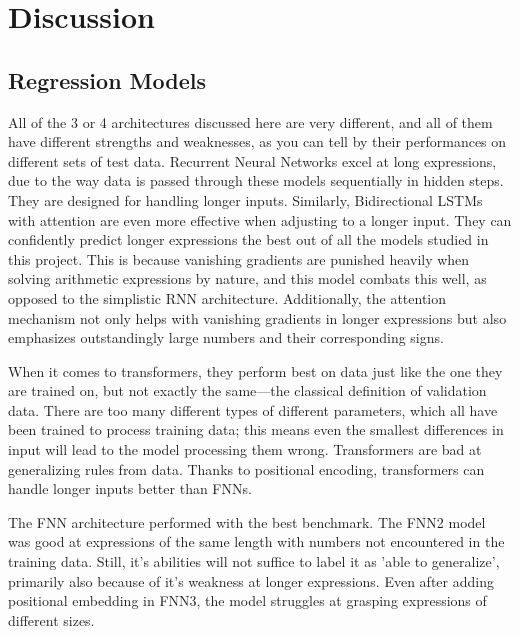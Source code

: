 \documentclass{article}
\begin{document}
\section{Discussion}
\subsection{Regression Models}
All of the 3 or 4 architectures discussed here are very different, and all of them have different strengths and weaknesses, as you can tell by their performances on different sets of test data. Recurrent Neural Networks excel at long expressions, due to the way data is passed through these models sequentially in hidden steps. They are designed for handling longer inputs. Similarly, Bidirectional LSTMs with attention are even more effective when adjusting to a longer input. They can confidently predict longer expressions the best out of all the models studied in this project. This is because vanishing gradients are punished heavily when solving arithmetic expressions by nature, and this model combats this well, as opposed to the simplistic RNN architecture. Additionally, the attention mechanism not only helps with vanishing gradients in longer expressions but also emphasizes outstandingly large numbers and their corresponding signs. 

When it comes to transformers, they perform best on data just like the one they are trained on, but not exactly the same—the classical definition of validation data. There are too many different types of different parameters, which all have been trained to process training data; this means even the smallest differences in input will lead to the model processing them wrong. Transformers are bad at generalizing rules from data. Thanks to positional encoding, transformers can handle longer inputs better than FNNs.

The FNN architecture performed with the best benchmark. The FNN2 model was good at expressions of the same length with numbers not encountered in the training data. Still, it's abilities will not suffice to label it as 'able to generalize', primarily also because of it's weakness at longer expressions. Even after adding positional embedding in FNN3, the model struggles at grasping expressions of different sizes.
\end{document}
